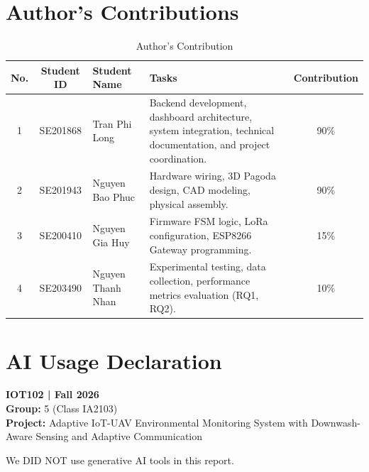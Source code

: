 \documentclass[11pt, a4paper]{article}
\begin{document}
\section*{Author's Contributions}

\begin{table}[htbp]
\caption{Author's Contribution}
\begin{center}
\renewcommand{\arraystretch}{1.3} %
\begin{tabular}{|c|c|p{4cm}|p{6cm}|c|}
\hline
\textbf{No.} & \textbf{Student ID} & \textbf{Student Name} & \textbf{Tasks} & \textbf{Contribution} \\
\hline
1 & SE201868 & Tran Phi Long & Backend development, dashboard architecture, system integration, technical documentation, and project coordination. & 90\% \\
\hline
2 & SE201943 & Nguyen Bao Phuc & Hardware wiring, 3D Pagoda design, CAD modeling, physical assembly. & 90\% \\
\hline
3 & SE200410 & Nguyen Gia Huy & Firmware FSM logic, LoRa configuration, ESP8266 Gateway programming. & 15\% \\
\hline
4 & SE203490 & Nguyen Thanh Nhan & Experimental testing, data collection, performance metrics evaluation (RQ1, RQ2). & 10\% \\
\hline
\end{tabular}
\label{tab:contribution}
\end{center}
\end{table}

\newpage
\section*{AI Usage Declaration}
\textbf{IOT102 | Fall 2026} \\
\textbf{Group:} 5 (Class IA2103) \\
\textbf{Project:} Adaptive IoT-UAV Environmental Monitoring System with Downwash-Aware Sensing and Adaptive Communication

\vspace{0.3cm}
\noindent [~~] We DID NOT use generative AI tools in this report. \\
\end{document}
